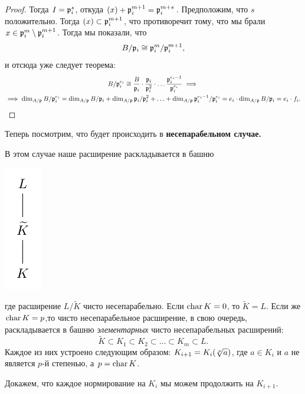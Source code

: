 \begin{proof}
		Тогда $I = \mathfrak{p}_{i}^{s}$, откуда $(x) + \mathfrak{p}_{i}^{m + 1} = \mathfrak{p}_{i}^{m + s}$. Предположим, что $s$ положительно. Тогда $(x) \subset \mathfrak{p}_i^{m + 1}$, что противоречит тому, что мы брали $x \in \mathfrak{p}_i^{m}\setminus \mathfrak{p}_{i}^{m + 1}$. Тогда мы показали, что 
		\[
			B/\mathfrak{p}_i \cong \mathfrak{p}_i^m/\mathfrak{p}_i^{m + 1},
		\]
		и отсюда уже следует теорема: 
		\begin{multline*}
			B/\mathfrak{p}_{i}^{e_i} \cong \frac{B}{\mathfrak{p}_{i}} \cdot \frac{\mathfrak{p}_i}{\mathfrak{p}_{i}^2}  \cdot \ldots \frac{\mathfrak{p}_i^{e_i - 1}}{\mathfrak{p}_{i}^{e_i}} \implies \\ \implies \dim_{A/\mathfrak{p}} B/\mathfrak{p}_i^{e_i} = \dim_{A/\mathfrak{p}}{B/\mathfrak{p}_i} + \dim_{A/\mathfrak{p}}{\mathfrak{p}_i/\mathfrak{p}_i^2} + \ldots + \dim_{A/\mathfrak{p}}{\mathfrak{p}_i^{e_i - 1}/\mathfrak{p}_i^{e_i}} = e_i \cdot \dim_{A/\mathfrak{p}}{B/\mathfrak{p}_i} = e_i \cdot f_i.  
		\end{multline*}
	\end{proof}

	Теперь посмотрим, что будет происходить в \bf{несепарабельном} случае. 

	В этом случае наше расширение раскладывается в башню 
	\begin{center}
		\includegraphics{lectures/6/pictures/cd_22.pdf}
	\end{center}

	
 	
 	где расширение $L/\widetilde{K}$ чисто несепарабельно. Если $\operatorname{char}{K} = 0$, то $\widetilde{K} = L$. Если же $\operatorname{char}{K} = p$,то чисто несепарабельное расширение, в свою очередь, раскладывается в башню \emph{элементарных} чисто несепарабельных расширений:
 	\[
 		\widetilde{K} \subset K_1 \subset K_2 \subset \ldots \subset K_m \subset L.
 	\]
 	Каждое из них устроено следующим образом: $K_{i + 1} = K_i\lr*{\sqrt[p]{a}}$, где $a \in K_i$ и $a$ не является $p$-й степенью, а $p = \operatorname{char}{K}$.  

 	Докажем, что каждое нормирование на $K_i$ мы можем продолжить на $K_{i + 1}$. 

